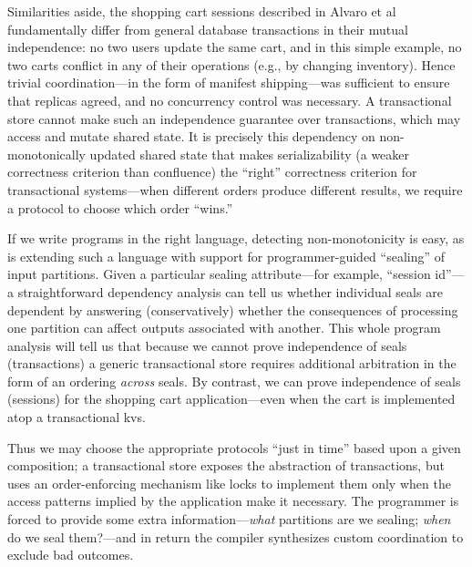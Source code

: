 \documentclass{sig-alternate}
\begin{document}
Similarities aside, the shopping cart sessions described in Alvaro et al fundamentally differ from general database transactions in their mutual independence: no two users update the same cart, and in this simple example, no two carts conflict in any of their operations (e.g., by changing inventory).  Hence trivial coordination---in the form of manifest shipping---was sufficient to ensure that replicas agreed, and no concurrency control was necessary.  A transactional store cannot make such an independence guarantee over transactions, which may access and mutate shared state.   It is precisely this dependency on non-monotonically updated shared state that makes serializability (a weaker correctness criterion than confluence) the ``right'' correctness criterion for transactional systems---when different orders produce different results, we require a protocol to choose which order ``wins.'' 

If we write programs in the right language, detecting non-monotonicity is easy, as is extending such a language with support for programmer-guided ``sealing'' of input partitions.  Given a particular sealing attribute---for example, ``session id''---a straightforward dependency analysis can tell us whether individual seals are dependent by answering (conservatively) whether the consequences of processing one partition can affect outputs associated with another.  This whole program analysis will tell us that because we cannot prove independence of seals (transactions) a generic transactional store requires additional arbitration in the form of an ordering \emph{across} seals.  By contrast, we can prove independence of seals (sessions) for the shopping cart application---even when the cart is implemented atop a transactional kvs.  

Thus we may choose the appropriate protocols ``just in time'' based upon a given composition; a transactional store exposes the abstraction of transactions, but uses an order-enforcing mechanism like locks to implement them only when the access patterns implied by the application make it necessary. The programmer is forced to provide some extra information---\emph{what} partitions are we sealing; \emph{when} do we seal them?---and in return the compiler synthesizes custom coordination to exclude bad outcomes.  




\end{document}
